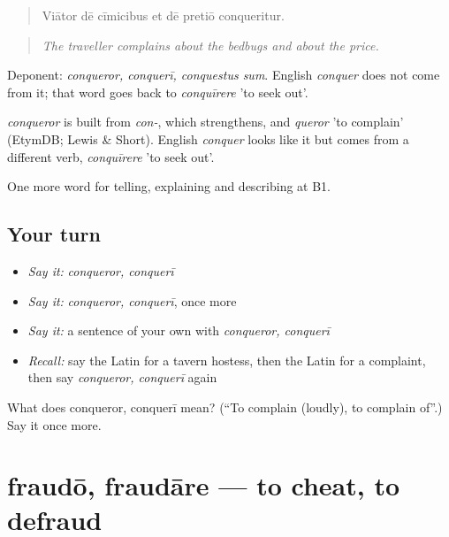 \begin{quote}
Viātor dē cīmicibus et dē pretiō conqueritur.
\end{quote}

\begin{quote}
\emph{The traveller complains about the bedbugs and about the price.}
\end{quote}

Deponent: \emph{conqueror, conquerī, conquestus sum}. English \emph{conquer} does not come from it; that word goes back to \emph{conquīrere} 'to seek out'.

\begin{cousinweb}
\emph{conqueror} is built from \emph{con-}, which strengthens, and \emph{queror} 'to complain' (EtymDB; Lewis \& Short). English \emph{conquer} looks like it but comes from a different verb, \emph{conquīrere} 'to seek out'.
\end{cousinweb}

\begin{grammarlens}[title={What you've built}]
One more word for telling, explaining and describing at B1.
\end{grammarlens}

\subsection*{Your turn}
\begin{itemize}
\raggedright
  \item \emph{Say it:} \emph{conqueror, conquerī}
  \item \emph{Say it:} \emph{conqueror, conquerī}, once more
  \item \emph{Say it:} a sentence of your own with \emph{conqueror, conquerī}
  \item \emph{Recall:} say the Latin for a tavern hostess, then the Latin for a complaint, then say \emph{conqueror, conquerī} again
\end{itemize}

\begin{tcolorbox}[breakable,colback=teal!4,colframe=teal!35!black,title={Before you move on}]
What does conqueror, conquerī mean? (\textquotedblleft{}To complain (loudly), to complain of\textquotedblright{}.) Say it once more.
\end{tcolorbox}
\section[fraudō, fraudāre]{fraudō, fraudāre — to cheat, to defraud}

